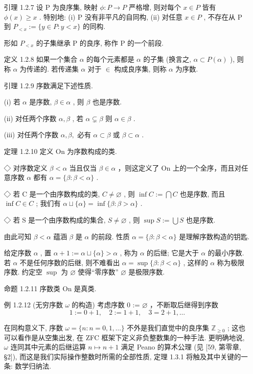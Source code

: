 \documentclass[]{article}
\begin{document}
引理 1.2.7 设 P 为良序集, 映射 $\phi: P \to P$ 严格增, 则对每个 $x \in P$ 皆有 $\phi(x) \geq x$ . 特别地: (i) P 没有非平凡的自同构, (ii) 对任意 $x \in P$ , 不存在从 P 到 $P_{<x} := \{y \in P : y < x\}$ 的同构. 

形如 $P_{<x}$ 的子集继承 P 的良序, 称作 P 的一个前段. 

定义 1.2.8 如果一个集合 $\alpha$ 的每个元素都是 $\alpha$ 的子集 (换言之, $\alpha \subset P(\alpha)$ ), 则称 $\alpha$ 为传递的. 若传递集 $\alpha$ 对于 $\in$ 构成良序集, 则称 $\alpha$ 为序数. 

引理 1.2.9 序数满足下述性质. 

(i) 若 $\alpha$ 是序数, $\beta \in \alpha$ , 则 $\beta$ 也是序数. 

(ii) 对任两个序数 $\alpha, \beta$ , 若 $\alpha \subsetneq \beta$ 则 $\alpha \in \beta$ . 

(iii) 对任两个序数 $\alpha, \beta,$ 必有 $\alpha \subset \beta$ 或 $\beta \subset \alpha$ . 

定理 1.2.10 定义 On 为序数构成的类. 

◇ 对序数定义 $\beta < \alpha$ 当且仅当 $\beta \in \alpha$ ，则这定义了 On 上的一个全序，而且对任意序数 $\alpha$ 都有 $\alpha = \{\beta : \beta < \alpha\}$ . 

◇ 若 C 是一个由序数构成的类, $C \neq \varnothing$ , 则 $\inf C := \bigcap C$ 也是序数, 而且 $\inf C \in C$ ;
我们有 $\alpha \sqcup \{\alpha\} = \inf\{\beta : \beta > \alpha\}$ . 

◇ 若 S 是一个由序数构成的集合, $S \neq \varnothing$ , 则 $\sup S := \bigcup S$ 也是序数. 

由此可知 $\beta < \alpha$ 蕴涵 $\beta$ 是 $\alpha$ 的前段. 性质 $\alpha = \{\beta : \beta < \alpha\}$ 是理解序数构造的钥匙. 

给定序数 $\alpha$ , 置 $\alpha + 1 := \alpha \sqcup \{\alpha\} > \alpha$ , 称为 $\alpha$ 的后继; 它是大于 $\alpha$ 的最小序数. 若 $\alpha$ 不是任何序数的后继, 则不难看出 $\alpha = \sup \{\beta : \beta < \alpha\}$ , 这样的 $\alpha$ 称为极限序数. 约定空 $\sup$ 为 $\varnothing$ 使得“零序数” $\varnothing$ 是极限序数. 

命题 1.2.11 序数类 On 是真类. 

例 1.2.12 (无穷序数 $\omega$ 的构造) 考虑序数 0 := $\varnothing$ ，不断取后继得到序数 $$
1 := 0 + 1, \quad 2 := 1 + 1, \quad 3 = 2 + 1, \ldots
$$

在同构意义下, 序数 $\omega = \{n : n = 0,1,\ldots\}$ 不外是我们直觉中的良序集 $\mathbb{Z}_{\geq 0}$ ; 这也可以看作是从空集出发, 在 ZFC 框架下定义非负整数集的一种手法. 更明确地说, $\omega$ 连同其中元素的后继运算 $n \mapsto n + 1$ 满足 Peano 的算术公理 (见 [59, 第零章, §2]), 而这是我们实际操作整数时所需的全部性质, 定理 1.3.1 将触及其中关键的一条: 数学归纳法. 
\end{document}
